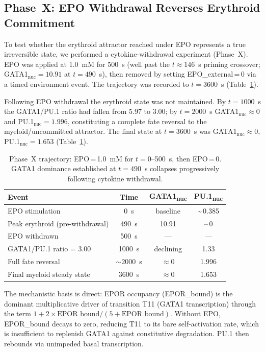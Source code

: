 \subsection{Phase~X: EPO Withdrawal Reverses Erythroid Commitment}

To test whether the erythroid attractor reached under EPO represents a true irreversible state, we performed a cytokine-withdrawal experiment (Phase~X). EPO was applied at 1.0~mM for 500~s (well past the $t\approx146$~s priming crossover; GATA1$_\text{nuc}=10.91$ at $t=490$~s), then removed by setting EPO\_external\,=\,0 via a timed environment event. The trajectory was recorded to $t=3600$~s (Table~\ref{tab:phaseX}).

Following EPO withdrawal the erythroid state was not maintained. By $t=1000$~s the GATA1/PU.1 ratio had fallen from 5.97 to 3.00; by $t=2000$~s GATA1$_\text{nuc}\approx 0$ and PU.1$_\text{nuc}=1.996$, constituting a complete fate reversal to the myeloid/uncommitted attractor. The final state at $t=3600$~s was GATA1$_\text{nuc}\approx 0$, PU.1$_\text{nuc}=1.653$ (Table~\ref{tab:phaseX}).

\begin{table}[ht]
\caption{Phase~X trajectory: EPO\,=\,1.0~mM for $t=0$--500~s, then EPO\,=\,0. GATA1 dominance established at $t=490$~s collapses progressively following cytokine withdrawal.}
\label{tab:phaseX}
\centering
\small
\begin{tabularx}{\linewidth}{@{}lccc@{}}
\toprule
\textbf{Event} & \textbf{Time} & \textbf{GATA1\textsubscript{nuc}} & \textbf{PU.1\textsubscript{nuc}} \\
\midrule
EPO stimulation & 0~s & baseline & \textasciitilde\,0.385 \\
Peak erythroid (pre-withdrawal) & 490~s & 10.91 & \textasciitilde\,0 \\
EPO withdrawn & 500~s & --- & --- \\
GATA1/PU.1 ratio = 3.00 & 1000~s & declining & 1.33 \\
Full fate reversal & $\sim$2000~s & $\approx$0 & 1.996 \\
Final myeloid steady state & 3600~s & $\approx$0 & 1.653 \\
\bottomrule
\end{tabularx}
\end{table}

The mechanistic basis is direct: EPOR occupancy (EPOR\_bound) is the dominant multiplicative driver of transition T11 (GATA1 transcription) through the term $1 + 2\times\text{EPOR\_bound}/(5+\text{EPOR\_bound})$. Without EPO, EPOR\_bound decays to zero, reducing T11 to its bare self-activation rate, which is insufficient to replenish GATA1 against constitutive degradation. PU.1 then rebounds via unimpeded basal transcription.

